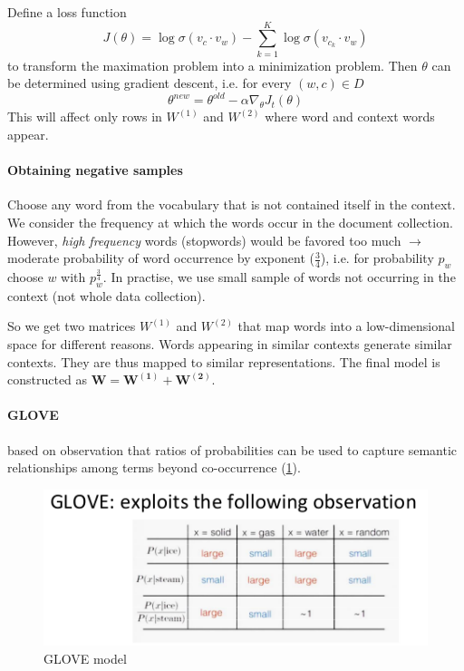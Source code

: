 Define a loss function
$$ J(\theta) = \log \sigma(v_c \cdot v_w) - \sum^K_{k=1} \log \sigma(v_{c_k} \cdot v_w)
$$
to transform the maximation problem into a minimization problem. Then $\theta$ can be determined using gradient descent, i.e. for every $(w,c) \in D$
$$ \theta^{new} = \theta^{old} - \alpha \nabla_\theta J_t(\theta)
$$
This will affect only rows in $W^{(1)}$ and $W^{(2)}$ where word and context words appear.

\paragraph{Obtaining negative samples} Choose any word from the vocabulary that is not contained itself in the context. We consider the frequency at which the words occur in the document collection. However, \emph{high frequency} words (stopwords) would be favored too much $\longrightarrow$ moderate probability of word occurrence by exponent ($\frac{3}{4}$), i.e. for probability $p_w$ choose $w$ with $p_w^{\frac{3}{4}}$. In practise, we use small sample of words not occurring in the context (not whole data collection).

So we get two matrices $W^{(1)}$ and $W^{(2)}$ that map words into a low-dimensional space for different reasons. Words appearing in similar contexts generate similar contexts. They are thus mapped to similar representations. The final model is constructed as $\mathbf{W = W^{(1)} + W^{(2)}}$.

\paragraph{GLOVE} based on observation that ratios of probabilities can be used to capture semantic relationships among terms beyond co-occurrence (\cref{fig:GLOVE}).

\begin{figure}
  \centering
  \includegraphics[width=\linewidth]{figures/GLOVE.png}
  \caption{GLOVE model}
  \label{fig:GLOVE}
\end{figure}

